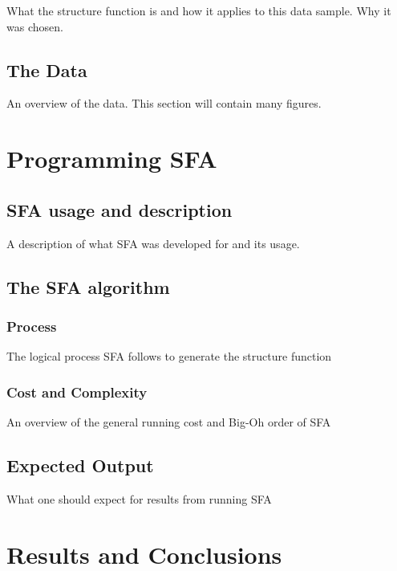 \documentclass[12pt, oneside]{smuthesis}
\begin{document}
\citep{collier2001}
What the structure function is and how it applies to this data sample. Why it was chosen.

\section{\sc The Data} \label{theData}

An overview of the data. This section will contain many figures.

\chapter{\sc Programming SFA} \label{programmingSFA}

\section{\sc SFA usage and description} \label{usageDescription}

A description of what SFA was developed for and its usage.

\section{\sc The SFA algorithm} \label{algorithm}

\subsection{\sc Process}

The logical process SFA follows to generate the structure function

\subsection{\sc Cost and Complexity} \label{costComplexity}

An overview of the general running cost and Big-Oh order of SFA

\section{\sc Expected Output} \label{expectedOutput}

What one should expect for results from running SFA

\chapter{\sc Results and Conclusions} \label{resultsConclusions}
\end{document}
